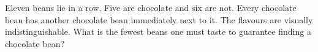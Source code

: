 Eleven beans lie in a row. Five are chocolate and six are not. Every chocolate bean has another chocolate bean immediately next to it. The flavours are visually indistinguishable. What is the fewest beans one must taste to guarantee finding a chocolate bean?
